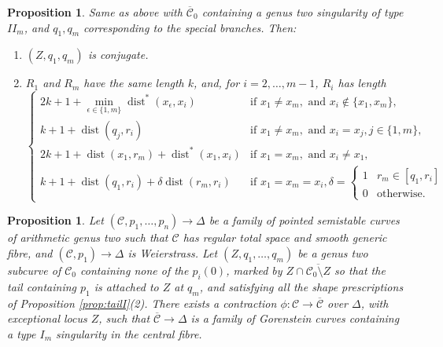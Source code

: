 \documentclass[11pt]{amsart}
\renewcommand{\to}{\rightarrow}
\newcommand{\dvr}{\Delta}
\newcommand{\dist}{\operatorname{dist}}
\theoremstyle{plain}
\newtheorem{prop}[thm]{Proposition}
\theoremstyle{definition}
\begin{document}
\begin{prop}\label{prop:tailII}
 Same as above with $\overline{\mathcal C}_0$ containing a genus two singularity of type $I\!I_m$, and $q_1,q_m$ corresponding to the special branches. Then:
 \begin{enumerate}[leftmargin=.6cm]
  \item $(Z,q_1,q_m)$ is conjugate.
  \item $R_1$ and $R_m$ have the same length $k$, and, for $i=2,\ldots,m-1$, $R_i$ has length 
  \begin{equation*}
  \begin{cases}
   2k+1+\min_{\epsilon\in\{1,m\}}\dist^*(x_\epsilon,x_i) & \text{if } x_1\neq x_m, \text{ and } x_i\notin\{x_1,x_m\},\\
   k+1+\dist(q_j, r_i)  & \text{if } x_1\neq x_m, \text{ and } x_i=x_j, j\in\{1,m\}, \\
   2k+1+\dist(x_1,r_m)+\dist^*(x_1,x_i) & \text{if } x_1= x_m, \text{ and } x_i\neq x_1, \\
   k+1+\dist(q_1, r_i)+\delta\dist(r_m,r_i)& \text{if } x_1= x_m= x_i, \delta=\begin{cases} 1 & r_m\in[q_1,r_i] \\ 0 & \text{otherwise.} \end{cases}
  \end{cases} 
  \end{equation*}
 \end{enumerate}
\end{prop}
\begin{prop}\label{prop:contractionI}
 Let $(\mathcal C,p_1,\ldots,p_n)\to\dvr$ be a family of pointed semistable curves of arithmetic genus two such that $\mathcal C$ has regular total space and smooth generic fibre, and $(\mathcal C,p_1)\to \Delta$ is Weierstrass. Let $(Z,q_1,\ldots,q_m)$ be a genus two subcurve of $\mathcal C_0$ containing none of the $p_i(0)$, marked by $Z\cap \overline{\mathcal C_0\setminus Z}$ so that the tail containing $p_1$ is attached to $Z$ at $q_m$, and satisfying all the shape prescriptions of Proposition \ref{prop:tailI}(2). There exists a contraction $\phi\colon\mathcal C\to\overline{\mathcal C}$ over $\dvr$, with exceptional locus $Z$, such that $\overline{\mathcal C}\to\dvr$ is a family of Gorenstein curves containing a type $I_m$ singularity in the central fibre.
\end{prop}
\end{document}
